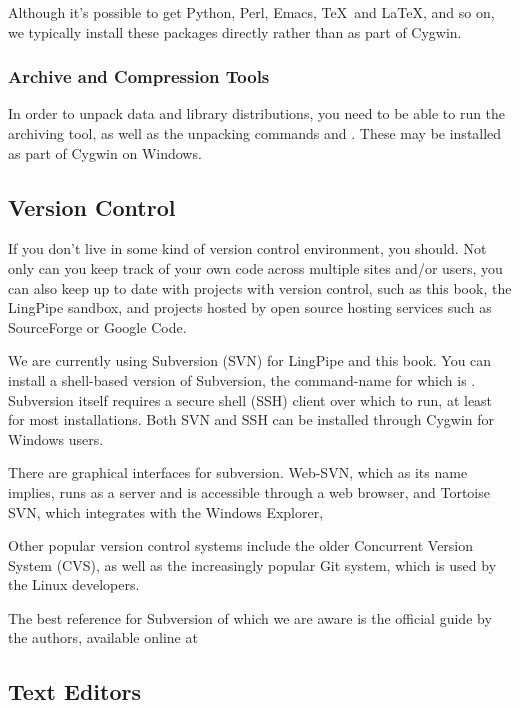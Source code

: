 Although it's possible to get Python, Perl, Emacs, \TeX\ and \LaTeX,
and so on, we typically install these packages directly rather than
as part of Cygwin.


\subsubsection{Archive and Compression Tools}

In order to unpack data and library distributions, you need to be able
to run the  archiving tool, as well as the unpacking commands
 and .  These may be installed as part of
Cygwin on Windows.


\subsection{Version Control}

If you don't live in some kind of version control environment, you should.
Not only can you keep track of your own code across multiple sites and/or
users, you can also keep up to date with projects with version control,
such as this book, the LingPipe sandbox, and projects hosted by open
source hosting services such as SourceForge or Google Code.

We are currently using Subversion (SVN) for LingPipe and this book.
You can install a shell-based version of Subversion, the command-name
for which is .  Subversion itself requires a secure shell
(SSH) client over which to run, at least for most installations.  Both
SVN and SSH can be installed through Cygwin for Windows users.

There are graphical interfaces for subversion.  
Web-SVN, which as its name implies, runs as a server and is
accessible through a web browser, 
%
%
and Tortoise SVN, which integrates with the Windows Explorer,
%

Other popular version control systems include the older Concurrent
Version System (CVS), as well as the increasingly popular Git system,
which is used by the Linux developers.

The best reference for Subversion of which we are aware is the
official guide by the authors, available online at 
%


\subsection{Text Editors}

